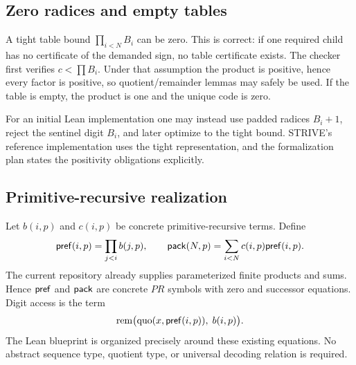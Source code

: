 \subsection{Zero radices and empty tables}

A tight table bound \(\prod_{i<N}B_i\) can be zero.  This is correct: if one
required child has no certificate of the demanded sign, no table certificate
exists.  The checker first verifies \(c<\prod B_i\).  Under that assumption the
product is positive, hence every factor is positive, so quotient/remainder
lemmas may safely be used.  If the table is empty, the product is one and the
unique code is zero.

For an initial Lean implementation one may instead use padded radices
\(B_i+1\), reject the sentinel digit \(B_i\), and later optimize to the tight
bound.  STRIVE's reference implementation uses the tight representation, and
the formalization plan states the positivity obligations explicitly.

\subsection{Primitive-recursive realization}

Let \(b(i,p)\) and \(c(i,p)\) be concrete primitive-recursive terms.  Define
\[
 \mathsf{pref}(i,p)=\prod_{j<i}b(j,p),
 \qquad
 \mathsf{pack}(N,p)=\sum_{i<N}c(i,p)\mathsf{pref}(i,p).
\]
The current repository already supplies parameterized finite products and
sums.  Hence \(\mathsf{pref}\) and \(\mathsf{pack}\) are concrete \(PR\) symbols with zero and
successor equations.  Digit access is the term
\[
 \operatorname{rem}\bigl(
   \operatorname{quo}(x,\mathsf{pref}(i,p)),\;b(i,p)
 \bigr).
\]
The Lean blueprint  is organized precisely around
these existing equations.  No abstract sequence type, quotient type, or
universal decoding relation is required.
